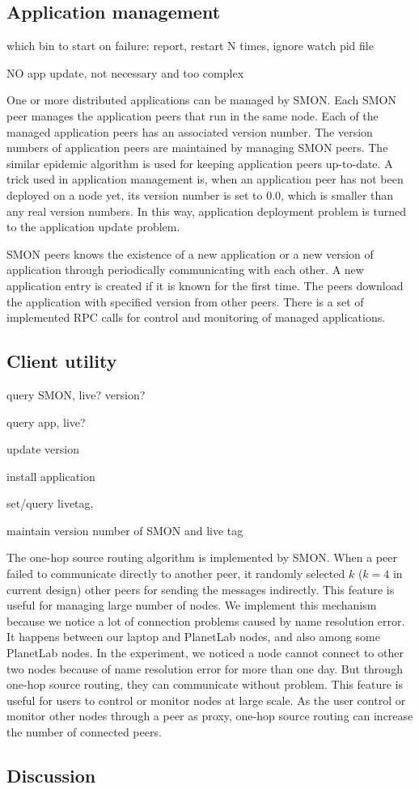 \subsection{Application management}

which bin to start
on failure: report, restart N times, ignore
watch pid file

NO app update, not necessary and too complex

One or more distributed applications can be managed by SMON. Each
SMON peer manages the application peers that run in the same
node. Each of the managed application peers has an associated
version number.  The version numbers of application peers are
maintained by managing SMON peers. The similar epidemic algorithm
is used for keeping application peers up-to-date. A trick used
in application management is, when an application peer has not
been deployed on a node yet, its version number is set to 0.0,
which is smaller than any real version numbers. In this way,
application deployment problem is turned to the application
update problem.

SMON peers knows the existence of a new application or a new
version of application through periodically communicating with each
other. A new application entry is created if it is known for the
first time.  The peers download the application with specified
version from other peers. There is a set of implemented RPC
calls for control and monitoring of managed applications.


\subsection{Client utility}

query SMON, live? version?

query app, live?

update version

install application

set/query livetag, 

maintain version number of SMON and live tag


The one-hop source routing\cite{Gummadi2004} algorithm is
implemented by SMON. When a peer failed to communicate directly
to another peer, it randomly selected $k$ ($k=4$ in current
design) other peers for sending the messages indirectly.  This
feature is useful for managing large number of nodes. We
implement this mechanism because we notice a lot of connection
problems caused by name resolution error. It happens between our
laptop and PlanetLab nodes, and also among some PlanetLab nodes.
In the experiment, we noticed a node cannot connect to other two
nodes because of name resolution error for more than one day.
But through one-hop source routing, they can communicate without
problem. This feature is useful for users to control or monitor
nodes at large scale. As the user control or monitor other nodes
through a peer as proxy, one-hop source routing can increase the
number of connected peers.

\subsection{Discussion}





